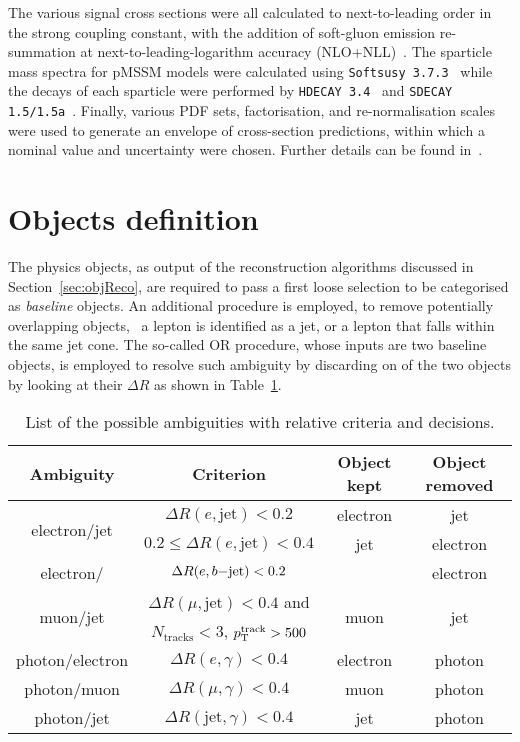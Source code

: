 			The various signal cross sections were all calculated to next-to-leading order in the strong coupling constant, with the addition of soft-gluon emission re-summation at next-to-leading-logarithm accuracy (NLO+NLL)~\cite{Beenakker:1997ut, Beenakker:2010nq, Beenakker:2011fu}. The sparticle mass spectra for \ac{pMSSM} models were calculated using \texttt{Softsusy 3.7.3}~\cite{Allanach:2001kg, Allanach:2013kza} while the decays of each sparticle were performed by \texttt{HDECAY 3.4}~\cite{hdecay} and \texttt{SDECAY 1.5/1.5a}~\cite{sdecay}. Finally, various \ac{PDF} sets, factorisation, and re-normalisation scales were used to generate an envelope of cross-section predictions, within which a nominal value and uncertainty were chosen. Further details can be found in~\cite{Borschensky:2014cia}.


	\section{Objects definition}
	\label{sec:obj_def}
			
		The physics objects, as output of the reconstruction algorithms discussed in Section~\ref{sec:objReco}, are required to pass a first loose selection to be categorised as \emph{baseline} objects. An additional procedure is employed, to remove potentially overlapping objects, \eg\ a lepton is identified as a jet, or a lepton that falls within the same jet cone. The so-called \ac{OR} procedure, whose inputs are two baseline objects, is employed to resolve such ambiguity by discarding on of the two objects by looking at their $\Delta R$ as shown in Table~\ref{tab:OR}. 

		\begin{table}[!htb]\centering\caption{List of the possible ambiguities with relative criteria and decisions.}
			\begin{tabular}{cccc}
				\toprule 
				\textbf{Ambiguity} & \textbf{Criterion} & \textbf{Object kept} & \textbf{Object removed}\\
				\toprule
				\multirow{2}{*}{electron/jet} & $\Delta R (e,\mathrm{jet}) < 0.2$ & electron & jet\\
				& $0.2 \leq \Delta R (e,\mathrm{jet}) < 0.4$ & jet & electron \\\midrule
				electron/\bj & $\Delta R (e,b\mathrm{-jet}) < 0.2$ & \bj\ & electron\\ \midrule
				\multirow{2}{*}{muon/jet} & $\Delta R (\mu,\mathrm{jet}) < 0.4$ and & \multirow{2}{*}{muon} & \multirow{2}{*}{jet} \\ 
						& $N_{\mathrm{tracks}} < 3$, $p_{\mathrm{T}}^{\mathrm{track}} > 500$ \MeV &  &  \\ \midrule
				photon/electron & $\Delta R (e,\gamma) < 0.4$ & electron & photon\\ 
				photon/muon & $\Delta R (\mu,\gamma) < 0.4$ & muon & photon\\ 
				photon/jet & $\Delta R (\mathrm{jet}, \gamma) < 0.4$ & jet & photon\\ 
				\bottomrule
				\end{tabular}
				\label{tab:OR}
		\end{table}

